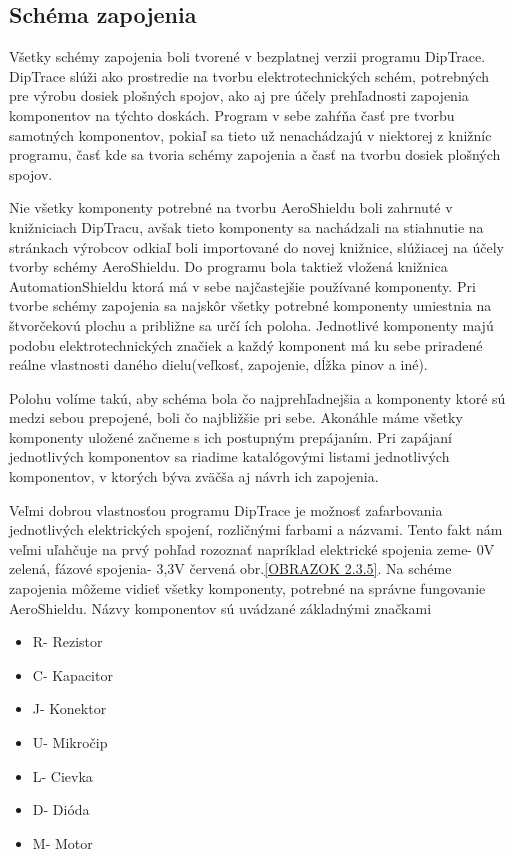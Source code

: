 \newpage


\subsection{Schéma zapojenia}

Všetky schémy zapojenia boli tvorené v bezplatnej verzii programu DipTrace. DipTrace slúži ako prostredie na tvorbu elektrotechnických schém, potrebných pre výrobu dosiek plošných spojov, ako aj pre účely prehľadnosti zapojenia komponentov na týchto doskách. Program v sebe zahŕňa časť pre tvorbu samotných komponentov, pokiaľ sa tieto už nenachádzajú v niektorej z knižníc programu, časť kde sa tvoria schémy zapojenia a časť na tvorbu dosiek plošných spojov.

Nie všetky komponenty potrebné na tvorbu AeroShieldu boli zahrnuté v knižniciach DipTracu, avšak tieto komponenty sa nachádzali na stiahnutie na stránkach výrobcov odkiaľ boli importované do novej knižnice, slúžiacej na účely tvorby schémy AeroShieldu. Do programu bola taktiež vložená knižnica AutomationShieldu ktorá má v sebe najčastejšie používané komponenty. Pri tvorbe schémy zapojenia sa najskôr všetky potrebné komponenty umiestnia na štvorčekovú plochu a približne sa určí ích poloha. Jednotlivé komponenty majú podobu elektrotechnických značiek a každý komponent má ku sebe priradené reálne vlastnosti daného dielu(veľkosť, zapojenie, dĺžka pinov a iné).

Polohu volíme takú, aby schéma bola čo najprehľadnejšia a komponenty ktoré sú medzi sebou prepojené, boli čo najbližšie pri sebe. Akonáhle máme všetky komponenty uložené začneme s ich postupným prepájaním. Pri zapájaní jednotlivých komponentov sa riadime katalógovými listami jednotlivých komponentov, v ktorých býva zväčša aj návrh ich zapojenia.

Veľmi dobrou vlastnosťou programu DipTrace je možnosť zafarbovania jednotlivých elektrických spojení, rozličnými farbami a názvami. Tento fakt nám veľmi uľahčuje na prvý pohľad rozoznať napríklad elektrické spojenia zeme- 0V zelená, fázové spojenia- 3,3V červená obr.\ref{OBRAZOK 2.3.5}. Na schéme zapojenia môžeme vidieť všetky komponenty, potrebné na správne fungovanie AeroShieldu. Názvy komponentov sú uvádzané základnými značkami
\begin{multicols}{3}
	\begin{itemize}
		\item R- Rezistor
		\item C- Kapacitor
		\item J- Konektor
		\item U- Mikročip
		\item L- Cievka
		\item D- Dióda
		\item M- Motor
	\end{itemize}
\end{multicols}


